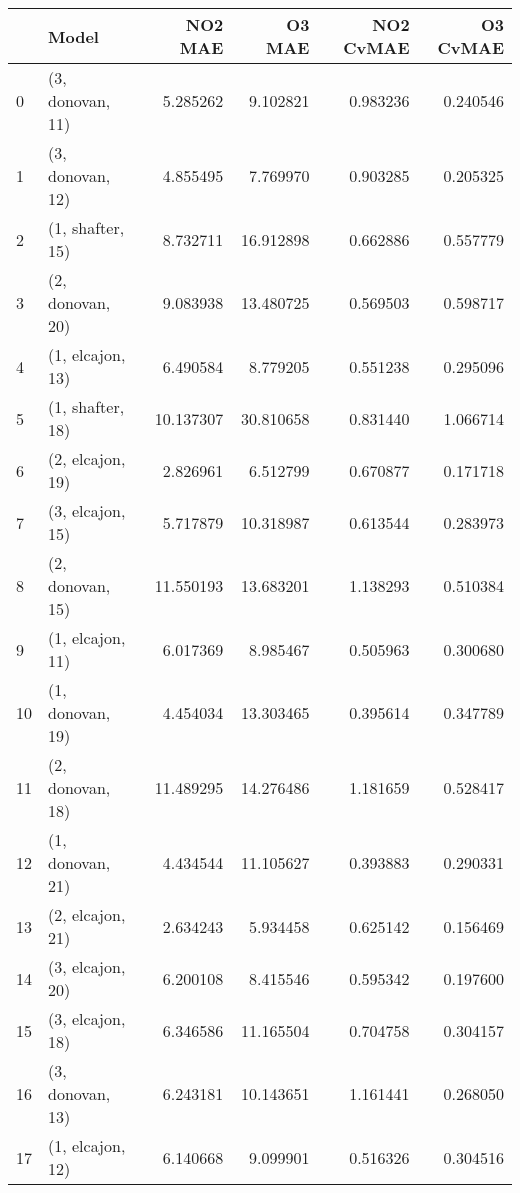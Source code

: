 \begin{tabular}{llrrrr}
\toprule
{} &             Model &    NO2 MAE &     O3 MAE &  NO2 CvMAE &  O3 CvMAE \\
\midrule
0  &  (3, donovan, 11) &   5.285262 &   9.102821 &   0.983236 &  0.240546 \\
1  &  (3, donovan, 12) &   4.855495 &   7.769970 &   0.903285 &  0.205325 \\
2  &  (1, shafter, 15) &   8.732711 &  16.912898 &   0.662886 &  0.557779 \\
3  &  (2, donovan, 20) &   9.083938 &  13.480725 &   0.569503 &  0.598717 \\
4  &  (1, elcajon, 13) &   6.490584 &   8.779205 &   0.551238 &  0.295096 \\
5  &  (1, shafter, 18) &  10.137307 &  30.810658 &   0.831440 &  1.066714 \\
6  &  (2, elcajon, 19) &   2.826961 &   6.512799 &   0.670877 &  0.171718 \\
7  &  (3, elcajon, 15) &   5.717879 &  10.318987 &   0.613544 &  0.283973 \\
8  &  (2, donovan, 15) &  11.550193 &  13.683201 &   1.138293 &  0.510384 \\
9  &  (1, elcajon, 11) &   6.017369 &   8.985467 &   0.505963 &  0.300680 \\
10 &  (1, donovan, 19) &   4.454034 &  13.303465 &   0.395614 &  0.347789 \\
11 &  (2, donovan, 18) &  11.489295 &  14.276486 &   1.181659 &  0.528417 \\
12 &  (1, donovan, 21) &   4.434544 &  11.105627 &   0.393883 &  0.290331 \\
13 &  (2, elcajon, 21) &   2.634243 &   5.934458 &   0.625142 &  0.156469 \\
14 &  (3, elcajon, 20) &   6.200108 &   8.415546 &   0.595342 &  0.197600 \\
15 &  (3, elcajon, 18) &   6.346586 &  11.165504 &   0.704758 &  0.304157 \\
16 &  (3, donovan, 13) &   6.243181 &  10.143651 &   1.161441 &  0.268050 \\
17 &  (1, elcajon, 12) &   6.140668 &   9.099901 &   0.516326 &  0.304516 \\
\bottomrule
\end{tabular}
